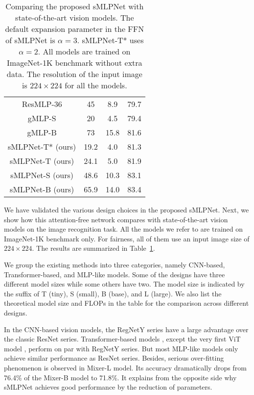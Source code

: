 \documentclass[letterpaper]{article} \usepackage{aaai22}  \usepackage{times}  \usepackage{helvet}  \usepackage{courier}  \usepackage[hyphens]{url}  \usepackage{graphicx} \usepackage{color}
\begin{document}
\begin{table}[t]
\begin{tabular}{c|c c c}
    ResMLP-36 & 45 & 8.9 & 79.7 \\
    gMLP-S& 20 & 4.5 & 79.4 \\
    gMLP-B& 73 & 15.8 & 81.6 \\
    \hline
    sMLPNet-T* (ours) &19.2 &4.0 &81.3 \\
    sMLPNet-T (ours) &24.1 &5.0 &81.9 \\
    sMLPNet-S (ours) &48.6 &10.3 &83.1  \\
    sMLPNet-B (ours) &65.9 &14.0 &83.4  \\
    \hline
\end{tabular}
\caption{Comparing the proposed sMLPNet with state-of-the-art vision models. The default expansion parameter in the FFN of sMLPNet is $\alpha=3$. sMLPNet-T* uses $\alpha=2$. All models are trained on ImageNet-1K benchmark without extra data. The resolution of the input image is $224 \times 224$ for all the models.}
\label{tab:main results}
\end{table}

We have validated the various design choices in the proposed sMLPNet. Next, we show how this attention-free network compares with state-of-the-art vision models on the image recognition task. All the models we refer to are trained on ImageNet-1K benchmark only. For fairness, all of them use an input image size of $224 \times 224$. The results are summarized in Table~\ref{tab:main results}. 

We group the existing methods into three categories, namely CNN-based, Transformer-based, and MLP-like models. Some of the designs have three different model sizes while some others have two. The model size is indicated by the suffix of T (tiny), S (small), B (base), and L (large). We also list the theoretical model size and FLOPs in the table for the comparison across different designs. 

In the CNN-based vision models, the RegNetY \cite{radosavovic2020designing} series have a large advantage over the classic ResNet series. Transformer-based models \cite{touvron2021training, zhou2021deepvit, liu2021swin}, except the very first ViT model \cite{dosovitskiy2020image}, perform on par with RegNetY series. But most MLP-like models \cite{touvron2021resmlp, liu2021pay} only achieve similar performance as ResNet series. Besides, serious over-fitting phenomenon is observed in Mixer-L model. Its accuracy dramatically drops from 76.4\% of the Mixer-B model to 71.8\%. It explains from the opposite side why sMLPNet achieves good performance by the reduction of parameters.
\end{document}

